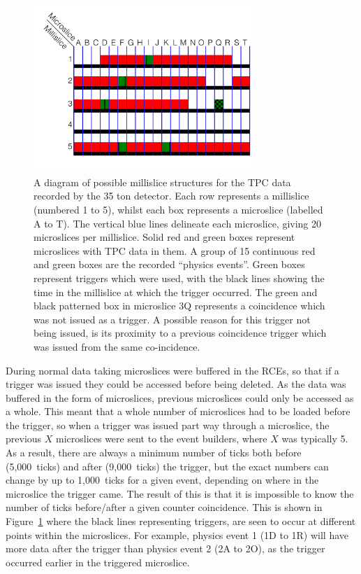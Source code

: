 \begin{figure}
  \centering
  \includegraphics[width=0.75\textwidth]{DataStructure}
  \caption[The 35 ton data structure]
          {A diagram of possible millislice structures for the TPC data recorded by the 35 ton detector. Each row represents a millislice (numbered 1 to 5), whilst each box represents a microslice (labelled A to T). The vertical blue lines delineate each microslice, giving 20 microslices per millislice. Solid red and green boxes represent microslices with TPC data in them. A group of 15 continuous red and green boxes are the recorded ``physics events''. Green boxes represent triggers which were used, with the black lines showing the time in the millislice at which the trigger occurred. The green and black patterned box in microslice 3Q represents a coincidence which was not issued as a trigger. A possible reason for this trigger not being issued, is its proximity to a previous coincidence trigger which was issued from the same co-incidence.}
  \label{fig:DataStructure}
\end{figure}

During normal data taking microslices were buffered in the RCEs, so that if a trigger was issued they could be accessed before being deleted. As the data was buffered in the form of microslices, previous microslices could only be accessed as a whole. This meant that a whole number of microslices had to be loaded before the trigger, so when a trigger was issued part way through a microslice, the previous $X$ microslices were sent to the event builders, where $X$ was typically 5. As a result, there are always a minimum number of ticks both before (5,000~ticks) and after (9,000~ticks) the trigger, but the exact numbers can change by up to 1,000~ticks for a given event, depending on where in the microslice the trigger came. The result of this is that it is impossible to know the number of ticks before/after a given counter coincidence. This is shown in Figure~\ref{fig:DataStructure} where the black lines representing triggers, are seen to occur at different points within the microslices. For example, physics event 1 (1D to 1R) will have more data after the trigger than physics event 2 (2A to 2O), as the trigger occurred earlier in the triggered microslice.

